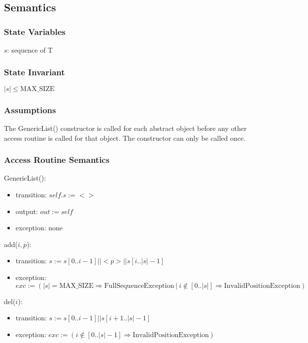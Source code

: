 \documentclass[12pt]{article}
\begin{document}
\subsection* {Semantics}

\subsubsection* {State Variables}
$s$: sequence of T

\subsubsection* {State Invariant}
$| s | \leq \mathrm{MAX\_SIZE}$

\subsubsection* {Assumptions}
The GenericList() constructor is called for each abstract object before any other access routine is called for that
object.  The constructor can only be called once.

\subsubsection* {Access Routine Semantics}

GenericList():
\begin{itemize}
\item transition: $\mathit{self}.s := < >$
\item output: $\mathit{out} := \mathit{self}$
\item exception: none
\end{itemize}

\noindent add($i, p$):
\begin{itemize}
\item transition: $s := s[0..i-1] || <p> || s[i..|s|-1]$
\item exception: $exc := (|s| = \mathrm{MAX\_SIZE} \Rightarrow  \mathrm{FullSequenceException} ~ | ~ i \notin [0..|s|] \Rightarrow
\mathrm{InvalidPositionException})$
\end{itemize}

\noindent del($i$):
\begin{itemize}
\item transition: $s := s[0..i-1] || s[i+1..|s|-1]$
\item exception:  $exc := (i \notin [0..|s|-1] \Rightarrow \mathrm{InvalidPositionException})$
\end{itemize}
\end{document}
